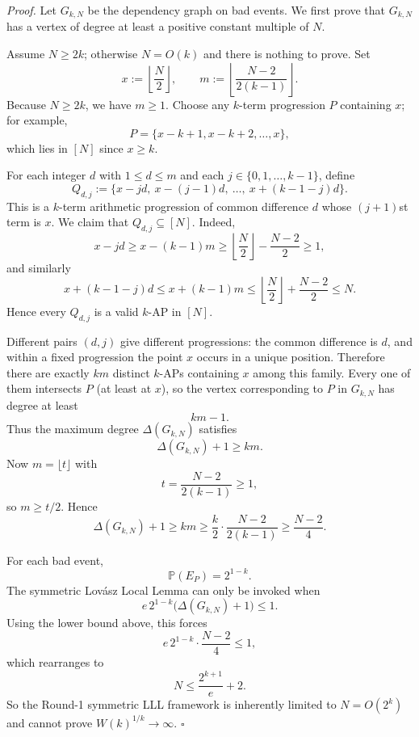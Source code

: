 \smallskip
\noindent\emph{Proof.}
Let $G_{k,N}$ be the dependency graph on bad events.  We first prove that $G_{k,N}$ has a vertex of degree at least a positive constant multiple of $N$.

Assume $N\ge 2k$; otherwise $N=O(k)$ and there is nothing to prove.
Set
\[
x:=\left\lfloor \frac{N}{2}\right\rfloor,
\qquad
m:=\left\lfloor \frac{N-2}{2(k-1)}\right\rfloor.
\]
Because $N\ge 2k$, we have $m\ge 1$.
Choose any $k$-term progression $P$ containing $x$; for example,
\[
P=\{x-k+1,x-k+2,\dots,x\},
\]
which lies in $[N]$ since $x\ge k$.

For each integer $d$ with $1\le d\le m$ and each $j\in\{0,1,\dots,k-1\}$, define
\[
Q_{d,j}:=\{x-jd,\ x-(j-1)d,\ \dots,\ x+(k-1-j)d\}.
\]
This is a $k$-term arithmetic progression of common difference $d$ whose $(j+1)$st term is $x$.
We claim that $Q_{d,j}\subseteq [N]$.
Indeed,
\[
x-jd \ge x-(k-1)m \ge \left\lfloor\frac N2\right\rfloor - \frac{N-2}{2} \ge 1,
\]
and similarly
\[
x+(k-1-j)d \le x+(k-1)m \le \left\lfloor\frac N2\right\rfloor + \frac{N-2}{2} \le N.
\]
Hence every $Q_{d,j}$ is a valid $k$-AP in $[N]$.

Different pairs $(d,j)$ give different progressions: the common difference is $d$, and within a fixed progression the point $x$ occurs in a unique position.  Therefore there are exactly $km$ distinct $k$-APs containing $x$ among this family.  Every one of them intersects $P$ (at least at $x$), so the vertex corresponding to $P$ in $G_{k,N}$ has degree at least
\[
km-1.
\]
Thus the maximum degree $\Delta(G_{k,N})$ satisfies
\[
\Delta(G_{k,N})+1\ge km.
\]
Now $m=\lfloor t\rfloor$ with
\[
t=\frac{N-2}{2(k-1)}\ge 1,
\]
so $m\ge t/2$.  Hence
\[
\Delta(G_{k,N})+1 \ge km \ge \frac{k}{2}\cdot \frac{N-2}{2(k-1)} \ge \frac{N-2}{4}.
\]

For each bad event,
\[
\mathbb P(E_P)=2^{1-k}.
\]
The symmetric Lov\'asz Local Lemma can only be invoked when
\[
e\,2^{1-k}\bigl(\Delta(G_{k,N})+1\bigr)\le 1.
\]
Using the lower bound above, this forces
\[
e\,2^{1-k}\cdot \frac{N-2}{4}\le 1,
\]
which rearranges to
\[
N\le \frac{2^{k+1}}{e}+2.
\]
So the Round-1 symmetric LLL framework is inherently limited to $N=O(2^k)$ and cannot prove $W(k)^{1/k}\to\infty$.
\hfill$\square$

